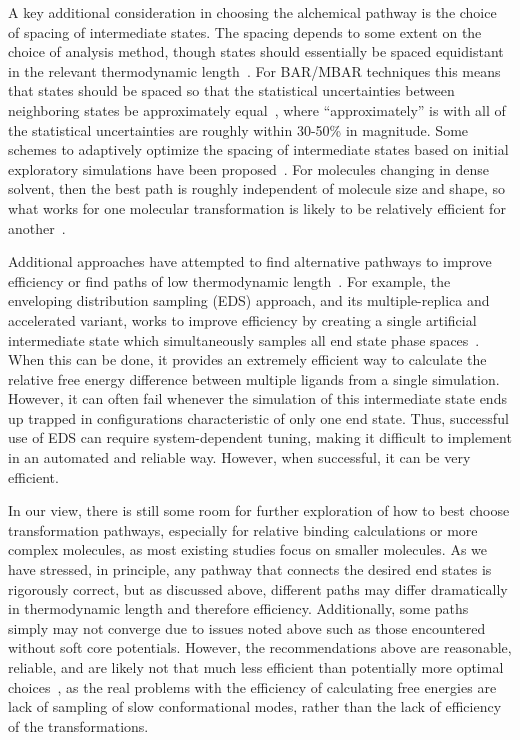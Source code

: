 \documentclass[9pt,bestpractices]{livecoms}
\begin{document}
A key additional consideration in choosing the alchemical pathway is the choice of spacing of intermediate states.
The spacing depends to some extent on the choice of analysis method, though states should essentially be spaced equidistant in the relevant thermodynamic length~\cite{crooks2007measuring, sivak2012thermodynamic}.
For BAR/MBAR techniques this means that states should be spaced so that the statistical uncertainties between neighboring states be approximately equal~\cite{pham2012optimal, shenfeld2009minimizing}, where ``approximately'' is with all of the statistical uncertainties are roughly within 30-50\% in magnitude. 
Some schemes to adaptively optimize the spacing of intermediate states based on initial exploratory simulations have been proposed~\cite{hayes2017adaptive}. For molecules changing in dense solvent, then the best path is roughly independent of molecule size and shape, so what works for one molecular transformation is likely to be relatively efficient for another~\cite{monroe2014converging}.

Additional approaches have attempted to find alternative pathways to improve efficiency or find paths of low thermodynamic length~\cite{naden2014linear,naden2015linear,pham2012optimal}. For example, the enveloping distribution sampling (EDS) approach, and its multiple-replica and accelerated variant, works to improve efficiency by creating a single artificial intermediate state which simultaneously samples all end state phase spaces~\cite{perthold2018accelerated,sidler2017efficient, christ2007enveloping}. When this can be done, it provides an extremely efficient way to calculate the relative free energy difference between multiple ligands from a single simulation. However, it can often fail whenever the simulation of this intermediate state ends up trapped in configurations characteristic of only one end state. Thus, successful use of EDS can require system-dependent tuning, making it difficult to implement in an automated and reliable way. However, when successful, it can be very efficient.


In our view, there is still some room for further exploration of how to best choose transformation pathways, especially for relative binding calculations or more complex molecules, as most existing studies focus on smaller molecules. As we have stressed, in principle, any pathway that connects the desired end states is rigorously correct, but as discussed above, different paths may differ dramatically in thermodynamic length and therefore efficiency. Additionally, some paths simply may not converge due to issues noted above such as those encountered without soft core potentials. However, the recommendations above are reasonable, reliable, and are likely not that much less efficient than potentially more optimal choices~\cite{naden2014linear,naden2015linear,pham2012optimal}, as the real problems with the efficiency of calculating free energies are lack of sampling of slow conformational modes, rather than the lack of efficiency of the transformations. 
\end{document}
